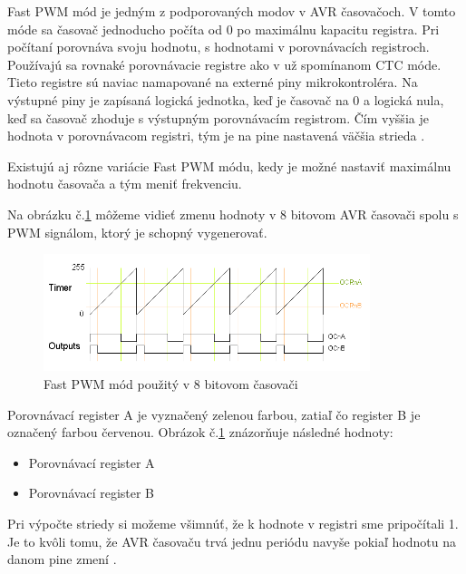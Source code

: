 \noindent \par
Fast PWM mód je jedným z podporovaných modov v AVR časovačoch. V tomto móde sa časovač jednoducho počíta od 0 po maximálnu kapacitu registra. Pri počítaní porovnáva svoju hodnotu, s hodnotami v porovnávacích registroch.
Používajú sa rovnaké porovnávacie registre ako v už spomínanom CTC móde. Tieto registre sú naviac namapované na externé piny mikrokontroléra.
Na výstupné piny je zapísaná logická jednotka, keď je časovač na 0 a logická nula, keď sa časovač zhoduje s výstupným porovnávacím registrom. Čím vyššia je hodnota
v porovnávacom registri, tým je na pine nastavená väčšia strieda \cite{shirriffSecretsArduinoPWM}. \par
Existujú aj rôzne variácie Fast PWM módu, kedy je možné nastaviť maximálnu hodnotu časovača a tým meniť frekvenciu. \par
Na obrázku č.\ref{figure:fast-pwm-mode} môžeme vidieť zmenu hodnoty v 8 bitovom AVR časovači spolu s PWM signálom, ktorý je schopný vygenerovať.
\begin{figure}[!h]
    \centering
    \includegraphics[width=0.85\textwidth]{img/fast-pwm-graph.png}
    \caption{Fast PWM mód použitý v 8 bitovom časovači}
    \label{figure:fast-pwm-mode}
\end{figure}

Porovnávací register A je vyznačený zelenou farbou, zatiaľ čo register B je označený farbou červenou. Obrázok č.\ref{figure:fast-pwm-mode} znázorňuje následné hodnoty:
\begin{itemize}
    \item Porovnávací register A
    \item Porovnávací register B
\end{itemize}

Pri výpočte striedy si možeme všimnúť, že k hodnote v registri sme pripočítali 1. Je to kvôli tomu, že AVR časovaču trvá jednu periódu navyše pokiaľ hodnotu
na danom pine zmení \cite{shirriffSecretsArduinoPWM}.

